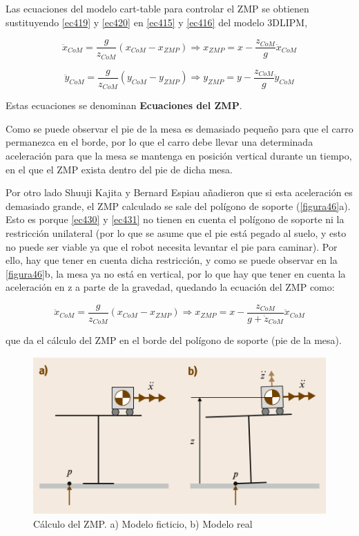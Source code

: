 Las ecuaciones del modelo cart-table para controlar el ZMP se obtienen sustituyendo \ref{ec419} y \ref{ec420} en \ref{ec415} y \ref{ec416} del modelo 3DLIPM,

\begin{equation}
\ddot{x}_{CoM}=\frac{g}{z_{CoM}}\left ( x_{CoM} - x_{ZMP} \right )\Rightarrow x_{ZMP} = x-\frac{z_{CoM}}{g}\ddot{x}_{CoM}
\label{ec430}
\end{equation}

\begin{equation}
\ddot{y}_{CoM}=\frac{g}{z_{CoM}}\left ( y_{CoM} - y_{ZMP} \right )\Rightarrow y_{ZMP} = y-\frac{z_{CoM}}{g}\ddot{y}_{CoM}
\label{ec431}
\end{equation}

Estas ecuaciones se denominan \textbf{Ecuaciones del ZMP}. 

Como se puede observar el pie de la mesa es demasiado pequeño para que el carro permanezca en el borde, por lo que el carro debe llevar una determinada aceleración para que la mesa se mantenga en posición vertical durante un tiempo, en el que el ZMP exista dentro del pie de dicha mesa.

Por otro lado Shuuji Kajita y Bernard Espiau \cite{ref20} añadieron que si esta aceleración es demasiado grande, el ZMP calculado se sale del polígono de soporte (\ref{figura46}a). Esto es porque \ref{ec430} y \ref{ec431} no tienen en cuenta el polígono de soporte ni la restricción unilateral (por lo que se asume que el pie está pegado al suelo, y esto no puede ser viable ya que el robot necesita levantar el pie para caminar). Por ello, hay que tener en cuenta dicha restricción, y como se puede observar en la \ref{figura46}b, la mesa ya no está en vertical, por lo que hay que tener en cuenta la aceleración en z a parte de la gravedad, quedando la ecuación del ZMP como:

\begin{equation}
\ddot{x}_{CoM}=\frac{g}{z_{CoM}}\left ( x_{CoM} - x_{ZMP} \right )\Rightarrow x_{ZMP} = x-\frac{z_{CoM}}{g+\ddot{z}_{CoM}}\ddot{x}_{CoM}
\label{ec432}
\end{equation}

que da el cálculo del ZMP en el borde del polígono de soporte (pie de la mesa). 

\begin{figure}[H]
\centering
\includegraphics[scale=0.6]{imagenes/apartado_4/47_cart_table_real}
\caption{Cálculo del ZMP. a) Modelo ficticio, b) Modelo real}
\label{figura47}
\end{figure}

